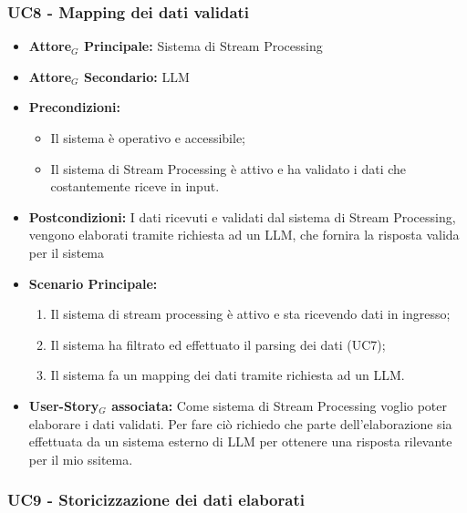 \documentclass[11pt]{article}
\begin{document}
\begin{justify}

\subsubsection{\textbf{UC8 - Mapping dei dati validati}}

\label{UC8}
\begin{itemize}
    \item \textbf{Attore$_G$ Principale:} Sistema di Stream Processing
    \item \textbf{Attore$_G$ Secondario:} LLM
    \item \textbf{Precondizioni:} 
        \begin{itemize}
          \item Il sistema è operativo e accessibile;
            \item Il sistema di Stream Processing è attivo e ha validato i dati che costantemente riceve in input.
        \end{itemize}
      \item \textbf{Postcondizioni:} I dati ricevuti e validati dal sistema di Stream Processing, vengono elaborati tramite richiesta ad un LLM, che fornira la risposta valida per il sistema\\
    \item \textbf{Scenario Principale:} 
        \begin{enumerate}
        \item Il sistema di stream processing è attivo e sta ricevendo dati in ingresso;
        \item Il sistema ha filtrato ed effettuato il parsing dei dati (UC7);
        \item Il sistema fa un mapping dei dati tramite richiesta ad un LLM.
        \end{enumerate}
    \item \textbf{User-Story$_G$ associata:} Come sistema di Stream Processing voglio poter elaborare i dati validati. Per fare ciò richiedo che parte dell'elaborazione sia effettuata da un sistema esterno di LLM per ottenere una risposta rilevante per il mio ssitema.
\end{itemize}


\subsubsection{\textbf{UC9 - Storicizzazione dei dati elaborati}}


\end{justify}
\end{document}
